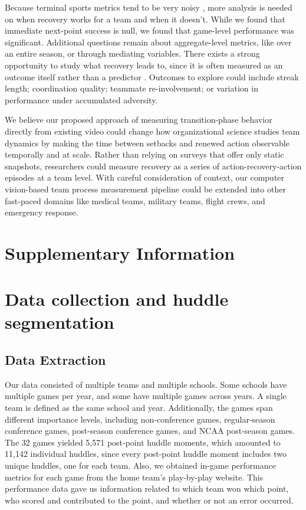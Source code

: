 \documentclass[12pt]{article}          %
\begin{document}
Because terminal sports metrics tend to be very noisy \citep{berger2011losing}, more analysis is needed on when recovery works for a team and when it doesn’t. While we found that immediate next-point success is null, we found that game-level performance was significant. Additional questions remain about aggregate-level metrics, like over an entire season, or through mediating variables. There exists a strong opportunity to study what recovery leads to, since it is often measured as an outcome itself rather than a predictor \citep{kirkman2026team}. Outcomes to explore could include streak length; coordination quality; teammate re-involvement; or variation in performance under accumulated adversity.

We believe our proposed approach of measuring transition-phase behavior directly from existing video could change how organizational science studies team dynamics by making the time between setbacks and renewed action observable temporally and at scale. Rather than relying on surveys that offer only static snapshots, researchers could measure recovery as a series of action-recovery-action episodes at a team level. With careful consideration of context, our computer vision-based team process measurement pipeline could be extended into other fast-paced domains like medical teams, military teams, flight crews, and emergency response.


\clearpage



\clearpage
\appendix
\section*{Supplementary Information}
\section{Data collection and huddle segmentation}


\subsection{Data Extraction}
Our data consisted of multiple teams and multiple schools. Some schools have multiple games per year, and some have multiple games across years. A single team is defined as the same school and year. Additionally, the games span different importance levels, including non-conference games, regular-season conference games, post-season conference games, and NCAA post-season games. The 32 games yielded 5,571 post-point huddle moments, which amounted to 11,142 individual huddles, since every post-point huddle moment includes two unique huddles, one for each team. Also, we obtained in-game performance metrics for each game from the home team's play-by-play website. This performance data gave us information related to which team won which point, who scored and contributed to the point, and whether or not an error occurred. 
\end{document}

